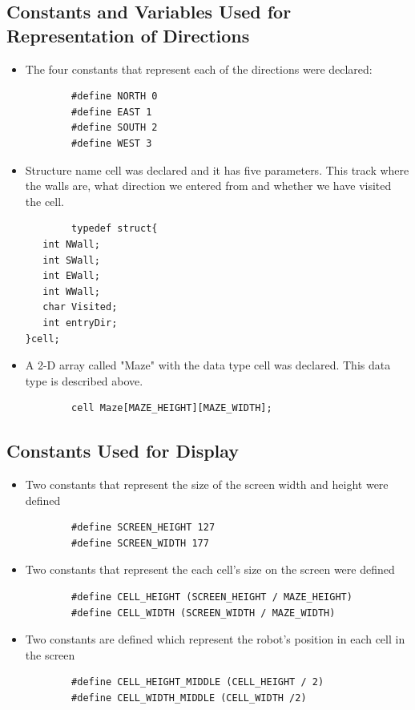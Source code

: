 \documentclass[11pt]{article}
\begin{document}

\subsection{Constants and Variables Used for Representation of Directions}
\begin{itemize}
\item The four constants that represent each of the directions were declared:
	\begin{verbatim}
		#define NORTH 0
		#define EAST 1
		#define SOUTH 2
		#define WEST 3
	\end{verbatim}
\item Structure name cell was declared and it has five parameters. This track where the walls are, what direction we entered from and whether we have visited the cell.
	\begin{verbatim}
		typedef struct{
   int NWall; 
   int SWall; 
   int EWall; 
   int WWall; 
   char Visited;
   int entryDir;
}cell;\end{verbatim}
\item A 2-D array called "Maze" with the data type cell was declared. This data type is described above.
	\begin{verbatim}
		cell Maze[MAZE_HEIGHT][MAZE_WIDTH];
	\end{verbatim}
\end{itemize}


\subsection{Constants Used for Display}
\begin{itemize}
\item Two constants that represent the size of the screen width and height were defined
	\begin{verbatim}
		#define SCREEN_HEIGHT 127
		#define SCREEN_WIDTH 177 
	\end{verbatim} 
\item Two constants that represent the each cell's size on the screen were defined
	\begin{verbatim}
		#define CELL_HEIGHT (SCREEN_HEIGHT / MAZE_HEIGHT)
		#define CELL_WIDTH (SCREEN_WIDTH / MAZE_WIDTH)
	\end{verbatim} 
\item Two constants are defined which represent the robot's position in each cell in the screen
	\begin{verbatim}
		#define CELL_HEIGHT_MIDDLE (CELL_HEIGHT / 2)
		#define CELL_WIDTH_MIDDLE (CELL_WIDTH /2)
	\end{verbatim}
\end{itemize}
\newpage
\end{document}
